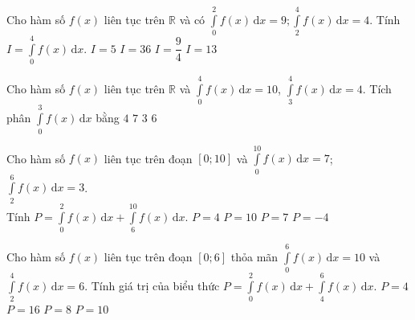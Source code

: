 \begin{ex}%
	Cho hàm số $f(x)$ liên tục trên $\mathbb{R}$ và có $\displaystyle\int\limits_0^2f(x)\mathrm{\,d}x=9;\displaystyle\int\limits_2^4f(x)\mathrm{\,d}x=4$. Tính $I=\displaystyle\int\limits_0^4f(x)\mathrm{\,d}x$.
	\choice
	{$I=5$}
	{$I=36$}
	{$I=\dfrac{9}{4}$}
	{\True $I=13$}
\end{ex}
\begin{ex}%
	Cho hàm số $f(x)$ liên tục trên $\mathbb{R}$ và $\displaystyle\int\limits_0^4f(x)\mathrm{\,d}x=10$, $\displaystyle\int\limits_3^4f(x)\mathrm{\,d}x=4$. Tích phân $\displaystyle\int\limits_0^3f(x)\mathrm{\,d}x$ bằng
	\choice
	{$4$}
	{$7$}
	{$3$}
	{\True $6$}
\end{ex}
\begin{ex}%
	Cho hàm số $f(x)$ liên tục trên đoạn $[0;10]$ và $\displaystyle\int\limits_0^{10}f(x)\mathrm{\,d}x=7$; $\displaystyle\int\limits_2^6f(x)\mathrm{\,d}x=3$.\\
	 Tính $P=\displaystyle\int\limits_0^2f(x)\mathrm{\,d}x+\displaystyle\int\limits_6^{10}f(x)\mathrm{\,d}x$.
	\choice
	{\True $P=4$}
	{$P=10$}
	{$P=7$}
	{$P=-4$}
\end{ex}
\begin{ex}%
	Cho hàm số $f(x)$ liên tục trên đoạn $[0; 6]$ thỏa mãn $\displaystyle\int\limits_0^6f(x)\mathrm{\,d}x=10$ và $\displaystyle\int\limits_2^4f(x)\mathrm{\,d}x=6$. 	Tính giá trị của biểu thức $P=\displaystyle\int\limits_0^2f(x)\mathrm{\,d}x+\displaystyle\int\limits_4^6f(x)\mathrm{\,d}x$.
	\choice
	{\True$P=4$}
	{$P=16$}
	{$P=8$}
	{$P=10$}
\end{ex}
